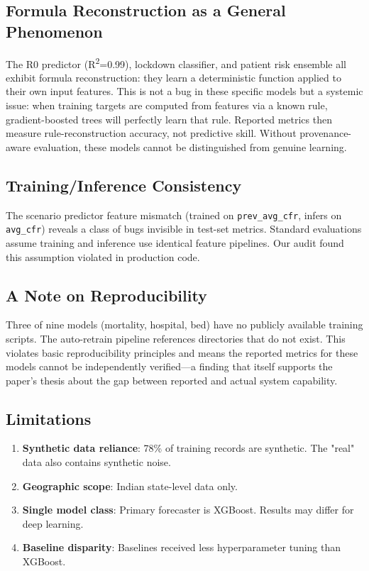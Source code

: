 \documentclass{ieeeaccess}
\begin{document}
\subsection{Formula Reconstruction as a General Phenomenon}
The R0 predictor (R\textsuperscript{2}=0.99), lockdown classifier, and patient risk ensemble all exhibit formula reconstruction: they learn a deterministic function applied to their own input features. This is not a bug in these specific models but a systemic issue: when training targets are computed from features via a known rule, gradient-boosted trees will perfectly learn that rule. Reported metrics then measure rule-reconstruction accuracy, not predictive skill. Without provenance-aware evaluation, these models cannot be distinguished from genuine learning.

\subsection{Training/Inference Consistency}
The scenario predictor feature mismatch (trained on \texttt{prev\_avg\_cfr}, infers on \texttt{avg\_cfr}) reveals a class of bugs invisible in test-set metrics. Standard evaluations assume training and inference use identical feature pipelines. Our audit found this assumption violated in production code.

\subsection{A Note on Reproducibility}
Three of nine models (mortality, hospital, bed) have no publicly available training scripts. The auto-retrain pipeline references directories that do not exist. This violates basic reproducibility principles and means the reported metrics for these models cannot be independently verified---a finding that itself supports the paper's thesis about the gap between reported and actual system capability.

\subsection{Limitations}
\begin{enumerate}
    \item \textbf{Synthetic data reliance}: 78\% of training records are synthetic. The "real" data also contains synthetic noise.
    \item \textbf{Geographic scope}: Indian state-level data only.
    \item \textbf{Single model class}: Primary forecaster is XGBoost. Results may differ for deep learning.
    \item \textbf{Baseline disparity}: Baselines received less hyperparameter tuning than XGBoost.
\end{enumerate}
\end{document}
